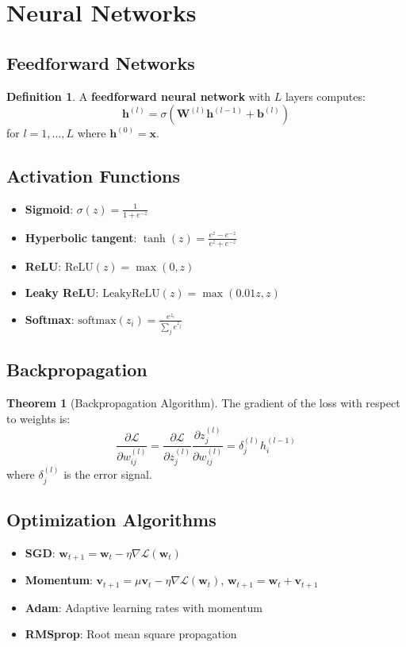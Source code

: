 \documentclass[11pt]{article}
\theoremstyle{definition}
\newtheorem{definition}{Definition}[section]
\newtheorem{theorem}{Theorem}[section]
\begin{document}
\section{Neural Networks}

\subsection{Feedforward Networks}
\begin{definition}
A \textbf{feedforward neural network} with $L$ layers computes:
$$\mathbf{h}^{(l)} = \sigma(\mathbf{W}^{(l)}\mathbf{h}^{(l-1)} + \mathbf{b}^{(l)})$$
for $l = 1, \ldots, L$ where $\mathbf{h}^{(0)} = \mathbf{x}$.
\end{definition}

\subsection{Activation Functions}
\begin{itemize}
    \item \textbf{Sigmoid}: $\sigma(z) = \frac{1}{1+e^{-z}}$
    \item \textbf{Hyperbolic tangent}: $\tanh(z) = \frac{e^z - e^{-z}}{e^z + e^{-z}}$
    \item \textbf{ReLU}: $\text{ReLU}(z) = \max(0, z)$
    \item \textbf{Leaky ReLU}: $\text{LeakyReLU}(z) = \max(0.01z, z)$
    \item \textbf{Softmax}: $\text{softmax}(z_i) = \frac{e^{z_i}}{\sum_j e^{z_j}}$
\end{itemize}

\subsection{Backpropagation}
\begin{theorem}[Backpropagation Algorithm]
The gradient of the loss with respect to weights is:
$$\frac{\partial \mathcal{L}}{\partial w_{ij}^{(l)}} = \frac{\partial \mathcal{L}}{\partial z_j^{(l)}} \frac{\partial z_j^{(l)}}{\partial w_{ij}^{(l)}} = \delta_j^{(l)} h_i^{(l-1)}$$
where $\delta_j^{(l)}$ is the error signal.
\end{theorem}

\subsection{Optimization Algorithms}
\begin{itemize}
    \item \textbf{SGD}: $\mathbf{w}_{t+1} = \mathbf{w}_t - \eta \nabla \mathcal{L}(\mathbf{w}_t)$
    \item \textbf{Momentum}: $\mathbf{v}_{t+1} = \mu \mathbf{v}_t - \eta \nabla \mathcal{L}(\mathbf{w}_t)$, $\mathbf{w}_{t+1} = \mathbf{w}_t + \mathbf{v}_{t+1}$
    \item \textbf{Adam}: Adaptive learning rates with momentum
    \item \textbf{RMSprop}: Root mean square propagation
\end{itemize}
\end{document}
